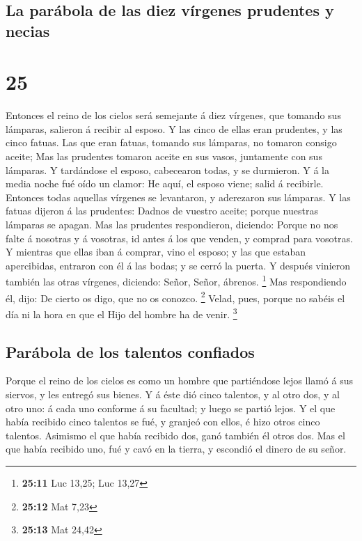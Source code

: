 \hypertarget{la-paruxe1bola-de-las-diez-vuxedrgenes-prudentes-y-necias}{%
\subsection{La parábola de las diez vírgenes prudentes y
necias}\label{la-paruxe1bola-de-las-diez-vuxedrgenes-prudentes-y-necias}}

\hypertarget{section-24}{%
\section{25}\label{section-24}}

 Entonces el reino de los cielos será semejante á diez
vírgenes, que tomando sus lámparas, salieron á recibir al esposo.
 Y las cinco de ellas eran prudentes, y las cinco fatuas.
 Las que eran fatuas, tomando sus lámparas, no tomaron
consigo aceite;  Mas las prudentes tomaron aceite en sus
vasos, juntamente con sus lámparas.  Y tardándose el esposo,
cabecearon todas, y se durmieron.  Y á la media noche fué
oído un clamor: He aquí, el esposo viene; salid á recibirle.
 Entonces todas aquellas vírgenes se levantaron, y
aderezaron sus lámparas.  Y las fatuas dijeron á las
prudentes: Dadnos de vuestro aceite; porque nuestras lámparas se apagan.
 Mas las prudentes respondieron, diciendo: Porque no nos
falte á nosotras y á vosotras, id antes á los que venden, y comprad para
vosotras.  Y mientras que ellas iban á comprar, vino el
esposo; y las que estaban apercibidas, entraron con él á las bodas; y se
cerró la puerta.  Y después vinieron también las otras
vírgenes, diciendo: Señor, Señor, ábrenos. \footnote{\textbf{25:11} Luc
  13,25; Luc 13,27}  Mas respondiendo él, dijo: De cierto
os digo, que no os conozco. \footnote{\textbf{25:12} Mat 7,23}
 Velad, pues, porque no sabéis el día ni la hora en que el
Hijo del hombre ha de venir. \footnote{\textbf{25:13} Mat 24,42}

\hypertarget{paruxe1bola-de-los-talentos-confiados}{%
\subsection{Parábola de los talentos
confiados}\label{paruxe1bola-de-los-talentos-confiados}}

 Porque el reino de los cielos es como un hombre que
partiéndose lejos llamó á sus siervos, y les entregó sus bienes.
 Y á éste dió cinco talentos, y al otro dos, y al otro uno:
á cada uno conforme á su facultad; y luego se partió lejos.
 Y el que había recibido cinco talentos se fué, y granjeó
con ellos, é hizo otros cinco talentos.  Asimismo el que
había recibido dos, ganó también él otros dos.  Mas el que
había recibido uno, fué y cavó en la tierra, y escondió el dinero de su
señor.


